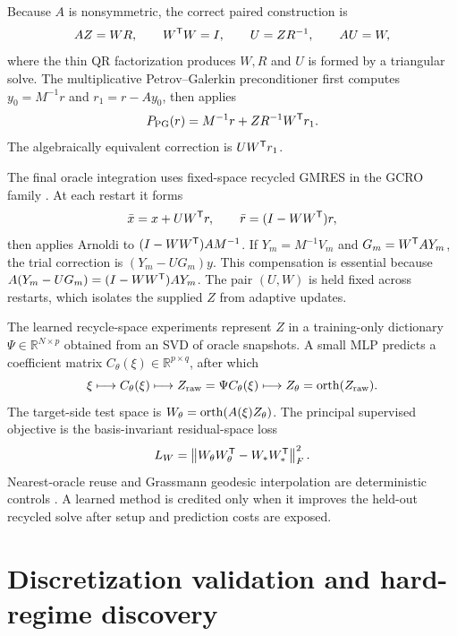 Because $A$ is nonsymmetric, the correct paired construction is
\begin{equation}
 AZ=WR,\qquad W^{\mathsf T} W=I,\qquad U=ZR^{-1},\qquad AU=W,
 \label{eq:paired}
\end{equation}
where the thin QR factorization produces $W,R$ and $U$ is formed by a triangular solve.  The multiplicative Petrov--Galerkin preconditioner first computes $y_0=M^{-1}r$ and $r_1=r-Ay_0$, then applies
\begin{equation}
 P_{\rm PG}(r)=M^{-1}r+ZR^{-1}W^{\mathsf T} r_1.
 \label{eq:pg}
\end{equation}
The algebraically equivalent correction is $UW^{\mathsf T} r_1$.

The final oracle integration uses fixed-space recycled GMRES in the GCRO family \citep{desturler1996gcro,parks2006gcrodr}.  At each restart it forms
\begin{equation}
 \bar x=x+UW^{\mathsf T} r,\qquad \bar r=(I-WW^{\mathsf T})r,
 \label{eq:initialprojection}
\end{equation}
then applies Arnoldi to $(I-WW^{\mathsf T})AM^{-1}$.  If $Y_m=M^{-1}V_m$ and $G_m=W^{\mathsf T} AY_m$, the trial correction is $(Y_m-UG_m)y$.  This compensation is essential because
$A(Y_m-UG_m)=(I-WW^{\mathsf T})AY_m$. The pair $(U,W)$ is held fixed across restarts, which isolates the supplied $Z$ from adaptive updates.

The learned recycle-space experiments represent $Z$ in a training-only dictionary $\Psi\in\mathbb R^{N\times p}$ obtained from an SVD of oracle snapshots. A small MLP predicts a coefficient matrix $C_\theta(\xi)\in\mathbb R^{p\times q}$, after which
\begin{equation}
 \xi\longmapsto C_\theta(\xi)\longmapsto
 Z_{\rm raw}=\Psi C_\theta(\xi)\longmapsto
 Z_\theta=\operatorname{orth}(Z_{\rm raw}).
 \label{eq:mlpipeline}
\end{equation}
The target-side test space is $W_\theta=\operatorname{orth}(A(\xi)Z_\theta)$.  The principal supervised objective is the basis-invariant residual-space loss
\begin{equation}
 L_W=\left\lVert W_\theta W_\theta^{\mathsf T}-W_*W_*^{\mathsf T}\right\rVert_F^2.
 \label{eq:wloss}
\end{equation}
Nearest-oracle reuse and Grassmann geodesic interpolation are deterministic controls \citep{edelman1998grassmann,amsallem2008interpolation}.  A learned method is credited only when it improves the held-out recycled solve after setup and prediction costs are exposed.

\section{Discretization validation and hard-regime discovery}

